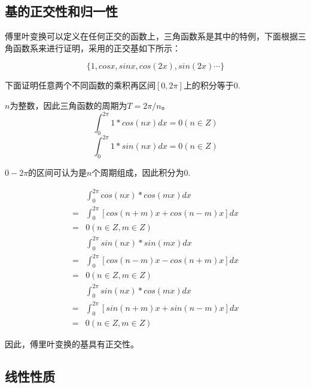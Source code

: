 \documentclass[journal]{IEEEtran}
\begin{document}
\subsection{基的正交性和归一性}

傅里叶变换可以定义在任何正交的函数上，三角函数系是其中的特例，下面根据三角函数系来进行证明，采用的正交基如下所示：

\begin{equation}
	\{ 1, cosx, sinx, cos(2x), sin(2x) \cdots \}
\end{equation}

下面证明任意两个不同函数的乘积再区间$[0, 2\pi]$上的积分等于0.

$n$为整数，因此三角函数的周期为$T = 2 \pi / n$。
\begin{equation}
	\int_{0}^{2 \pi} 1* cos(nx)dx = 0 (n\in Z)
\end{equation}
\begin{equation}
\int_{0}^{2 \pi} 1* sin(nx)dx = 0 (n\in Z)
\end{equation}

$0 - 2\pi$的区间可认为是$n$个周期组成，因此积分为0.

\begin{equation}
	\begin{split}
		&\int_{0}^{2 \pi} cos(nx)* cos(mx)dx{} \\ 
		= &\int_{0}^{2\pi}[cos(n+m)x+cos(n-m)x]dx {} \\
		= & 0 (n\in Z, m\in Z)
	\end{split}
\end{equation}
\begin{equation}
	\begin{split}
		&\int_{0}^{2 \pi} sin(nx)* sin(mx)dx{} \\ 
		= &\int_{0}^{2\pi}[cos(n-m)x-cos(n+m)x]dx {} \\
		= & 0 (n\in Z, m\in Z)
	\end{split}
\end{equation}
\begin{equation}
	\begin{split}
		&\int_{0}^{2 \pi} sin(nx)* cos(mx)dx{} \\ 
		= &\int_{0}^{2\pi}[sin(n+m)x+sin(n-m)x]dx {} \\
		= & 0 (n\in Z, m\in Z)
	\end{split}
\end{equation}

因此，傅里叶变换的基具有正交性。

\subsection{线性性质}
\end{document}
